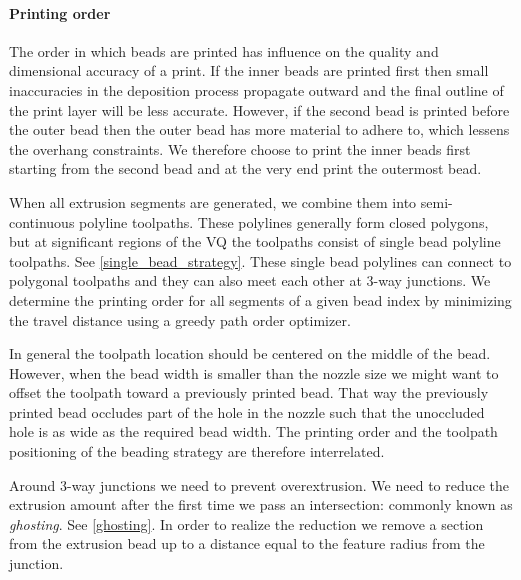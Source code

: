 \paragraph{Printing order}
The order in which beads are printed has influence on the quality and dimensional accuracy of a print.
If the inner beads are printed first then small inaccuracies in the deposition process propagate outward and the final outline of the print layer will be less accurate.
However, if the second bead is printed before the outer bead then the outer bead has more material to adhere to, which lessens the overhang constraints.
We therefore choose to print the inner beads first starting from the second bead and at the very end print the outermost bead.


When all extrusion segments are generated, we combine them into semi-continuous polyline toolpaths.
These polylines generally form closed polygons, but at significant regions of the VQ the toolpaths consist of single bead polyline toolpaths.
See \cref{single_bead_strategy}.
These single bead polylines can connect to polygonal toolpaths and they can also meet each other at 3-way junctions.
We determine the printing order for all segments of a given bead index by minimizing the travel distance using a greedy path order optimizer.


In general the toolpath location should be centered on the middle of the bead.
However, when the bead width is smaller than the nozzle size we might want to offset the toolpath toward a previously printed bead.
That way the previously printed bead occludes part of the hole in the nozzle such that the unoccluded hole is as wide as the required bead width.
The printing order and the toolpath positioning of the beading strategy are therefore interrelated.

Around 3-way junctions we need to prevent overextrusion.
We need to reduce the extrusion amount after the first time we pass an intersection: commonly known as \emph{ghosting}.
See \cref{ghosting}.
In order to realize the reduction we remove a section from the extrusion bead up to a distance equal to the feature radius from the junction.


